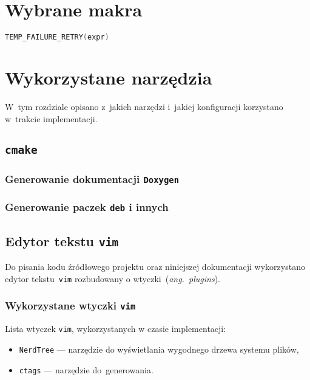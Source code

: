 \documentclass[thesis]{subfiles}
\begin{document}
\section{Wybrane makra}

\begin{lstlisting}[language=c,numbers=none,caption={Makro wykonujące wyrażenie dopóki kod błędu jest równy \texttt{EINTR}}]
TEMP_FAILURE_RETRY(expr)
\end{lstlisting}

\section{Wykorzystane narzędzia}

W~tym rozdziale opisano z~jakich narzędzi i~jakiej konfiguracji korzystano w~trakcie implementacji.

\subsection{\texttt{cmake}}
\subsubsection{Generowanie dokumentacji \texttt{Doxygen}}
\subsubsection{Generowanie paczek \texttt{deb} i innych}

\subsection{Edytor tekstu \texttt{vim}}

Do pisania kodu źródłowego projektu oraz niniejszej dokumentacji wykorzystano edytor tekstu~\texttt{vim} rozbudowany o wtyczki~(\emph{ang.~plugins}).

\subsubsection{Wykorzystane wtyczki \texttt{vim}}

\noindent Lista wtyczek \texttt{vim}, wykorzystanych w czasie implementacji:
\begin{itemize}
	\item\texttt{NerdTree} --- narzędzie do wyświetlania wygodnego drzewa systemu plików,
	\item\texttt{ctags} --- narzędzie do~generowania.
\end{itemize}
\end{document}
